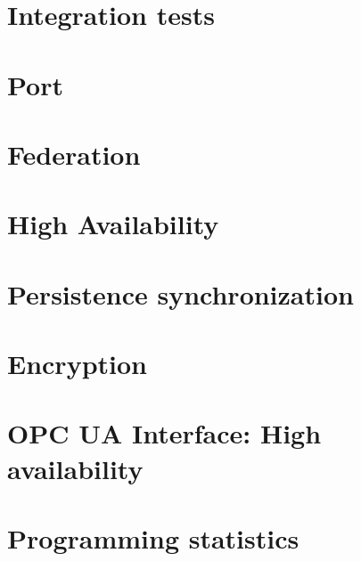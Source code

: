
\section{Integration tests}

\section{Port}\label{sec:res:port}


\section{Federation}\label{sec:res:cluster}

\section{High Availability}\label{sec:res:ha}


\section{Persistence synchronization}\label{sec:res:psync}

\section{Encryption}\label{sec:res:security}

\section{OPC UA Interface: High availability}\label{sec:res:opc-ua}



\section{Programming statistics}

